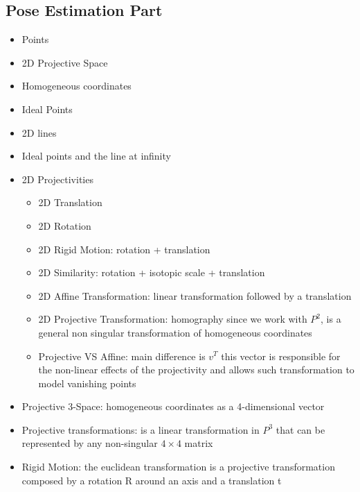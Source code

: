 \documentclass{article}
\begin{document}
\begin{itemize}
    \newpage
    \section{Pose Estimation Part}
    \begin{itemize}
        \item Points
        \item 2D Projective Space
        \item Homogeneous coordinates
        \item Ideal Points
        \item 2D lines
        \item Ideal points and the line at infinity
        \item 2D Projectivities
        \begin{itemize}
            \item 2D Translation
            \item 2D Rotation
            \item 2D Rigid Motion: rotation + translation
            \item 2D Similarity: rotation + isotopic scale + translation
            \item 2D Affine Transformation: linear transformation followed by a translation
            \item 2D Projective Transformation: homography since we work with \(P^2\), is a general non singular transformation of homogeneous coordinates
            \item Projective VS Affine: main difference is \(v^T\) this vector is responsible for the non-linear effects of the projectivity and allows such transformation to model vanishing points
        \end{itemize}
        \item Projective 3-Space: homogeneous coordinates as a 4-dimensional vector
        \item Projective transformations: is a linear transformation in \(P^3\) that can be represented by any non-singular \(4 \times 4\) matrix
        \item Rigid Motion: the euclidean transformation is a projective transformation composed by a rotation R around an axis and a translation t


\end{itemize}
\end{itemize}
\end{document}
